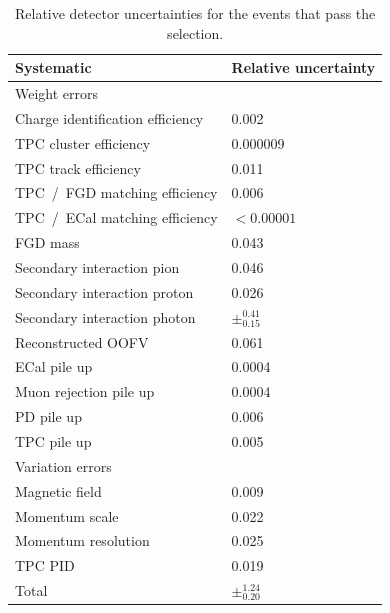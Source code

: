 \begin{table}[ht]
  \center
  \begin{tabular}{ll}
    \toprule
    Systematic & Relative uncertainty \\
    \midrule
    \multicolumn{2}{l}{Weight errors} \\
    \midrule
    Charge identification efficiency         & 0.002  \\
    \Gls{TPC} cluster efficiency             & 0.000009\\
    \Gls{TPC} track efficiency               & 0.011  \\
    \Gls{TPC}~/~\Gls{FGD} matching efficiency& 0.006  \\
    \Gls{TPC}~/~\Gls{ECal} matching efficiency & $< 0.00001$  \\
    \Gls{FGD} mass                           & 0.043  \\
    Secondary interaction pion               & 0.046  \\
    Secondary interaction proton             & 0.026  \\
    Secondary interaction photon             & $\pm^{0.41}_{0.15}$  \\
    Reconstructed \Gls{OOFV}                 & 0.061  \\
    \Gls{ECal} pile up                       & 0.0004 \\
    Muon rejection pile up                   & 0.0004  \\
    \Gls{PD} pile up                         & 0.006  \\
    \Gls{TPC} pile up                        & 0.005  \\
    \midrule
    \multicolumn{2}{l}{Variation errors} \\
    \midrule
    Magnetic field      & 0.009 \\
    Momentum scale      & 0.022 \\
    Momentum resolution & 0.025 \\
    \Gls{TPC} \Gls{PID} & 0.019 \\
    \midrule
    Total & $\pm^{1.24}_{0.20}$ \\
    \bottomrule
  \end{tabular}
  \caption[Detector uncertainties for the selected events]{Relative
    detector uncertainties for the events that pass the selection.}
  \label{tab:detectoruncertaintyinfv}
\end{table}

